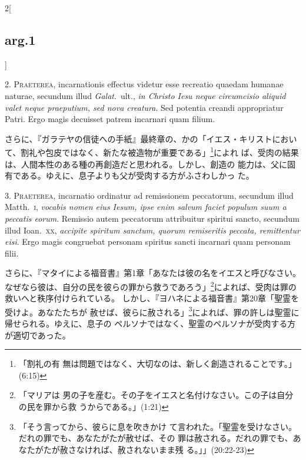 \documentclass[paper=a4paper,fontsize=10pt,jafontsize=9pt,titlepage]{jlreq}
\begin{document}
\begin{paracol}{2}[\subsection{arg.1}]

2. {\scshape Praeterea}, incarnationis effectus videtur esse recreatio quaedam humanae
naturae, secundum illud {\itshape Galat}.~ult., {\itshape in Christo Iesu neque circumcisio
aliquid valet neque praeputium, sed nova creatura}. Sed potentia creandi
appropriatur Patri. Ergo magis decuisset patrem incarnari quam filium.

\switchcolumn

さらに、『ガラテヤの信徒への手紙』最終章の、かの「イエス・キリストにおい
 て、割礼や包皮ではなく、新たな被造物が重要である」\footnote{「割礼の有
 無は問題ではなく、大切なのは、新しく創造されることです。」(6:15)}によれ
 ば、受肉の結果は、人間本性のある種の再創造だと思われる。しかし、創造の
 能力は、父に固有である。ゆえに、息子よりも父が受肉する方がふさわしかっ
 た。


3. {\scshape Praeterea}, incarnatio ordinatur ad remissionem peccatorum, secundum
illud Matth.~{\scshape i}, {\itshape vocabis nomen eius Iesum, ipse enim salvum faciet
populum suum a peccatis eorum}. Remissio autem peccatorum attribuitur
spiritui sancto, secundum illud Ioan.~{\scshape xx}, {\itshape accipite spiritum sanctum,
quorum remiseritis peccata, remittentur eisi}. Ergo magis congruebat
personam spiritus sancti incarnari quam personam filii.

\switchcolumn

さらに、『マタイによる福音書』第1章「あなたは彼の名をイエスと呼びなさい。
 なぜなら彼は、自分の民を彼らの罪から救うであろう」\footnote{「マリアは
 男の子を産む。その子をイエスと名付けなさい。この子は自分の民を罪から救
 うからである。」(1:21)}によれば、受肉は罪の救いへと秩序付けられている。
 しかし、『ヨハネによる福音書』第20章「聖霊を受けよ。あなたたちが
 赦せば、彼らに赦される」\footnote{「そう言ってから、彼らに息を吹きかけ
 て言われた。「聖霊を受けなさい。だれの罪でも、あなたがたが赦せば、その
 罪は赦される。だれの罪でも、あなたがたが赦さなければ、赦されないまま残
 る。」」(20:22-23)}によれば、罪の許しは聖霊に帰せられる。ゆえに、息子の
 ペルソナではなく、聖霊のペルソナが受肉する方が適切であった。

\switchcolumn*[\subsection{s.c.}]


\end{paracol}
\end{document}
